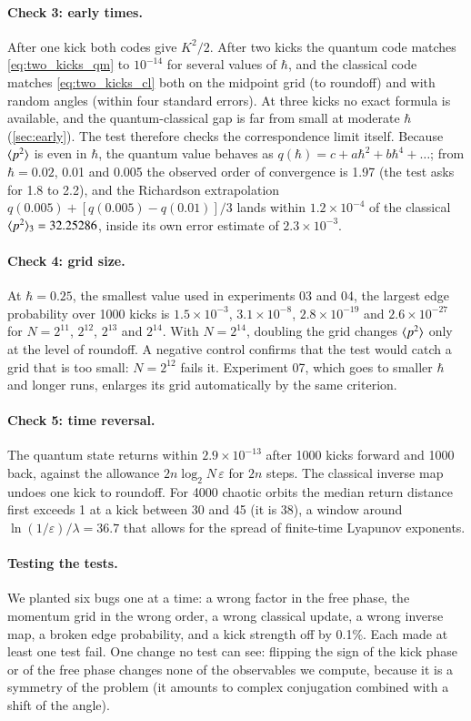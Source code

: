 \paragraph{Check 3: early times.}
After one kick both codes give $K^2/2$. After two kicks the quantum code matches \cref{eq:two_kicks_qm} to
$10^{-14}$ for several values of $\hbar$, and the classical code matches \cref{eq:two_kicks_cl} both on the
midpoint grid (to roundoff) and with random angles (within four standard errors). At three kicks no exact
formula is available, and the quantum-classical gap is far from small at moderate $\hbar$ (\cref{sec:early}).
The test therefore checks the correspondence limit itself. Because $\langle p^2 \rangle$ is even in $\hbar$, the quantum
value behaves as $q(\hbar) = c + a\hbar^2 + b\hbar^4 + \dots$; from $\hbar = 0.02$, 0.01 and 0.005 the observed
order of convergence is 1.97 (the test asks for 1.8 to 2.2), and the Richardson extrapolation
$q(0.005) + [q(0.005) - q(0.01)]/3$ lands within $1.2\times10^{-4}$ of the classical
$\langle p^2 \rangle_3 = 32.25286$, inside its own error estimate of $2.3\times10^{-3}$.

\paragraph{Check 4: grid size.}
At $\hbar = 0.25$, the smallest value used in experiments 03 and 04, the largest edge probability over 1000
kicks is $1.5\times10^{-3}$, $3.1\times10^{-8}$, $2.8\times10^{-19}$ and $2.6\times10^{-27}$ for
$N = 2^{11}$, $2^{12}$, $2^{13}$ and $2^{14}$. With $N = 2^{14}$, doubling the grid changes $\langle p^2 \rangle$ only at
the level of roundoff. A negative control confirms that the test would catch a grid that is too small:
$N = 2^{12}$ fails it. Experiment 07, which goes to smaller $\hbar$ and longer runs, enlarges its grid
automatically by the same criterion.

\paragraph{Check 5: time reversal.}
The quantum state returns within $2.9\times10^{-13}$ after 1000 kicks forward and 1000 back, against the
allowance $2n\log_2 N\,\varepsilon$ for $2n$ steps. The classical inverse map undoes one kick to roundoff. For
4000 chaotic orbits the median return distance first exceeds 1 at a kick between 30 and 45 (it is 38), a
window around $\ln(1/\varepsilon)/\lambda = 36.7$ that allows for the spread of finite-time Lyapunov exponents.

\paragraph{Testing the tests.}
We planted six bugs one at a time: a wrong factor in the free phase, the momentum grid in the wrong
order, a wrong classical update, a wrong inverse map, a broken edge probability, and a kick strength off by
0.1\%. Each made at least one test fail. One change no test can see: flipping the sign of the kick phase or of
the free phase changes none of the observables we compute, because it is a symmetry of the problem (it amounts
to complex conjugation combined with a shift of the angle).

